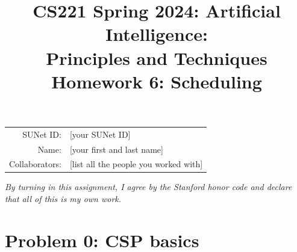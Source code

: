 \documentclass{article}
\title{\textbf{CS221 Spring 2024: Artificial Intelligence:\\ Principles and Techniques} \\Homework 6: Scheduling}
\date{}
\theoremstyle{case}
\theoremstyle{definition}
\begin{document}
\maketitle

\begin{center}
\begin{tabular}{rl}
SUNet ID: & [your SUNet ID] \\
Name: & [your first and last name] \\
Collaborators: & [list all the people you worked with]
\end{tabular}
\end{center}
\textit{By turning in this assignment, I agree by the Stanford honor code and declare
that all of this is my own work.} \\
\fontsize{12pt}{16pt}\selectfont

\section*{Problem 0: CSP basics}
\end{document}
